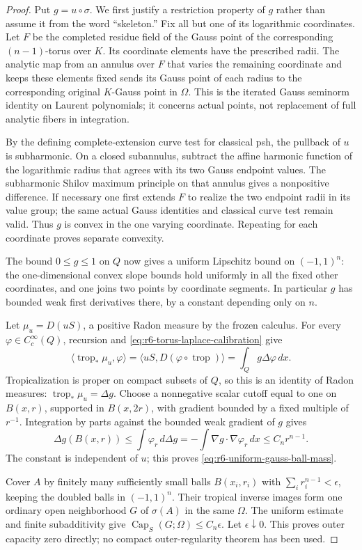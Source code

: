 \documentclass[11pt,a4paper]{article}
\numberwithin{equation}{section}
\theoremstyle{definition}
\theoremstyle{remark}
\begin{document}
\begin{proof}
Put $g=u\circ\sigma$. We first justify a restriction property of
$g$ rather than assume it from the word ``skeleton.'' Fix all but one
of its logarithmic coordinates. Let $F$ be the completed residue field
of the Gauss point of the corresponding $(n-1)$-torus over $K$.
Its coordinate elements have the prescribed radii. The analytic map
from an annulus over $F$ that varies the remaining coordinate and
keeps these elements fixed sends its Gauss point of each radius to
the corresponding original $K$-Gauss point in $\Omega$. This is the
iterated Gauss seminorm identity on Laurent polynomials; it concerns
actual points, not replacement of full analytic fibers in integration.

By the defining complete-extension curve test for classical psh, the
pullback of $u$ is subharmonic. On a closed subannulus, subtract the
affine harmonic function of the logarithmic radius that agrees with
its two Gauss endpoint values. The subharmonic Shilov maximum
principle on that annulus gives a nonpositive difference. If necessary
one first extends $F$ to realize the two endpoint radii in its value
group; the same actual Gauss identities and classical curve test
remain valid. Thus $g$ is convex in the one varying coordinate.
Repeating for each coordinate proves separate convexity.

The bound $0\le g\le1$ on $Q$ now gives a uniform Lipschitz bound
on $(-1,1)^n$: the one-dimensional convex slope bounds hold uniformly
in all the fixed other coordinates, and one joins two points by
coordinate segments. In particular $g$ has bounded weak first
derivatives there, by a constant depending only on $n$.

Let $\mu_u=D(uS)$, a positive Radon measure by the frozen calculus.
For every $\varphi\in C_c^\infty(Q)$, recursion and
\eqref{eq:r6-torus-laplace-calibration} give
\[
 \langle\operatorname{trop}_*\mu_u,\varphi\rangle
   =\langle uS,D(\varphi\circ\operatorname{trop})\rangle
   =\int_Q g\Delta\varphi\,dx.
\]
Tropicalization is proper on compact subsets of $Q$, so this is an
identity of Radon measures: $\operatorname{trop}_*\mu_u=\Delta g$.
Choose a nonnegative scalar cutoff equal to one on $B(x,r)$,
supported in $B(x,2r)$, with gradient bounded by a fixed multiple
of $r^{-1}$. Integration by parts against the bounded weak gradient
of $g$ gives
\[
 \Delta g(B(x,r))
    \le\int\varphi_r\,d\Delta g
    =-\int\nabla g\cdot\nabla\varphi_r\,dx
    \le C_n r^{n-1}.
\]
The constant is independent of $u$; this proves
\eqref{eq:r6-uniform-gauss-ball-mass}.

Cover $A$ by finitely many sufficiently small balls $B(x_i,r_i)$
with $\sum_i r_i^{n-1}<\epsilon$, keeping the doubled balls in
$(-1,1)^n$. Their tropical inverse images form one ordinary open
neighborhood $G$ of $\sigma(A)$ in the same $\Omega$. The uniform
estimate and finite subadditivity give
$\operatorname{Cap}_S(G;\Omega)\le C_n\epsilon$.
Let $\epsilon\downarrow0$. This proves outer capacity zero directly;
no compact outer-regularity theorem has been used.
\end{proof}
\end{document}
